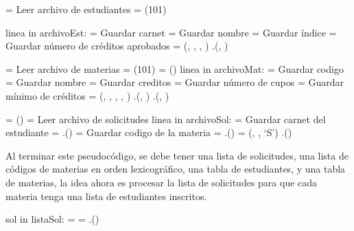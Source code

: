 \documentclass[11pt]{article}
\begin{document}
\begin{codebox}
   \li {} = Leer archivo de estudiantes
   \li {} =  (101)

   \li \For linea in archivoEst:
   \li \Do
       = Guardar carnet
      \li {} = Guardar nombre
      \li {} = Guardar índice
      \li {} = Guardar número de créditos aprobados
      \li {} =  (, , , )
      \li {}.(, )
      \End

   \li
   \li {} = Leer archivo de materias
   \li {} =  (101)
   \li {} =  ()
   \li \For linea in archivoMat:
   \li \Do
       = Guardar codigo
      \li {} = Guardar nombre
      \li {} = Guardar creditos
      \li {} = Guardar número de cupos
      \li {} = Guardar mínimo de créditos
      \li {} =  (, , , , )
      \li {}.(, )
      \li {}.(, )
      \End

   \li
   \li {} =  ()
   \li {} = Leer archivo de solicitudes
   \li \For linea in archivoSol:
   \li \Do
       = Guardar carnet del estudiante
      \li {} = .()
      \li {} = Guardar codigo de la materia
      \li {} = .()
      \li {} =  (, , `S')
      \li {}.() \label{li:Extraer-Datos-final}
      \End
   \End
   \end{codebox}

   Al terminar este pseudocódigo, se debe tener una lista de solicitudes,
   una lista de códigos de materias en orden lexicográfico, una tabla de
   estudiantes, y una tabla de materias, la idea ahora es procesar la lista
   de solicitudes para que cada materia tenga una lista de estudiantes inscritos.

   \begin{codebox}
      \li \For sol in listaSol:
      \Do
         \li {} = 
         \li {} = 
         \li {}.() \label{li:Procesar-Solicitudes-final}
         \End
      \End
   \end{codebox}
\end{document}
